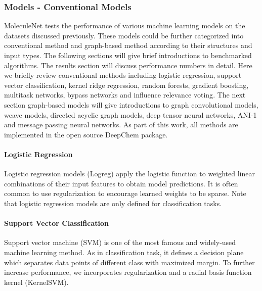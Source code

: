 \subsubsection{Models - Conventional Models}

MoleculeNet tests the performance of various machine learning models on the datasets discussed previously. These models could be further categorized into conventional method and graph-based method according to their structures and input types. The following sections will give brief introductions to benchmarked algorithms. The results section will discuss performance numbers in detail. Here we briefly review conventional methods including logistic regression, support vector classification, kernel ridge regression, random forests\cite{breiman2001random}, gradient boosting\cite{friedman2001greedy}, multitask networks\cite{ramsundar2015massively, ma2015deep}, bypass networks \cite{Bypass_network} and influence relevance voting\cite{IRV}. The next section graph-based models will give introductions to graph convolutional models\cite{graphconv_feat}, weave models\cite{kearnes2016graphconv}, directed acyclic graph models\cite{lusci2013deep}, deep tensor neural networks\cite{schutt2016quantum}, ANI-1\cite{ANI-1} and message passing neural networks\cite{MPNN}. As part of this work, all methods are implemented in the open source DeepChem package\cite{deepchem}.

\paragraph{Logistic Regression}

Logistic regression models (Logreg) apply the logistic function to weighted linear combinations of their input features to obtain model predictions. It is often common to use regularization to encourage learned weights to be sparse. \cite{friedman2000additive} Note that logistic regression models are only defined for classification tasks.

\paragraph{Support Vector Classification}

Support vector machine (SVM) is one of the most famous and widely-used machine learning method.\cite{cortes1995support} As in classification task, it defines a decision plane which separates data points of different class with maximized margin. To further increase performance, we incorporates regularization and a radial basis function kernel (KernelSVM).

